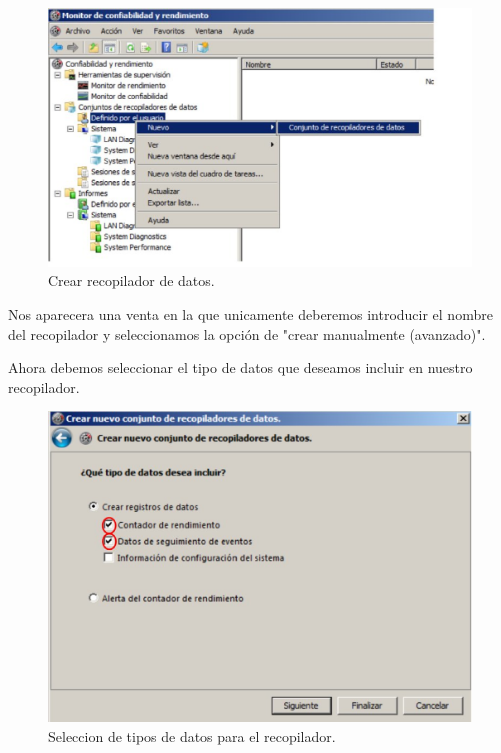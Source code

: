 \begin{figure}[H]
\begin{center}
\includegraphics[scale=0.4]{imagenes/ejercicio5-1.eps}
\caption{Crear recopilador de datos.}
\end{center}
\end{figure}

Nos aparecera una venta en la que unicamente deberemos introducir el nombre del recopilador y seleccionamos la opción de "crear manualmente (avanzado)".

Ahora debemos seleccionar el tipo de datos que deseamos incluir en nuestro recopilador.



\begin{figure}[H]
\begin{center}
\includegraphics[scale=0.4]{imagenes/ejercicio5-3.eps}
\caption{Seleccion de tipos de datos para el recopilador.}
\end{center}
\end{figure}

